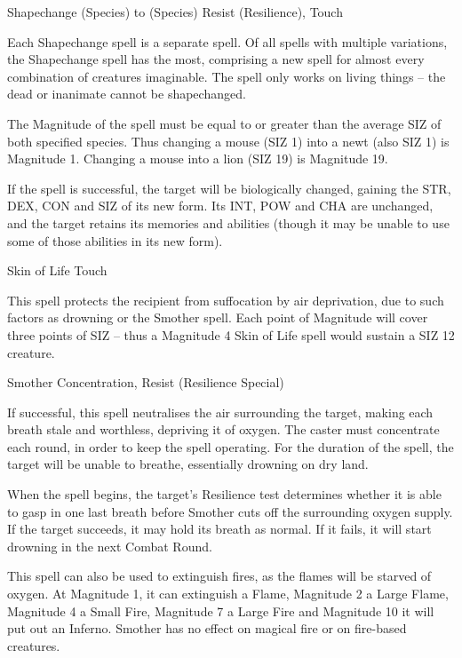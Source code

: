 \begin{samepage}
\begin{rpg-spell}
{Shapechange (Species) to (Species)}
{Resist (Resilience), Touch}

Each Shapechange spell is a separate spell. Of all spells with multiple variations, the Shapechange spell has the most, comprising a new spell for almost every combination of creatures imaginable. The spell only works on living things – the dead or inanimate cannot be shapechanged. 

The Magnitude of the spell must be equal to or greater than the average SIZ of both specified species. Thus changing a mouse (SIZ 1) into a newt (also SIZ 1) is Magnitude 1. Changing a mouse into a lion (SIZ 19) is Magnitude 19. 

If the spell is successful, the target will be biologically changed, gaining the STR, DEX, CON and SIZ of its new form. Its INT, POW and CHA are unchanged, and the target retains its memories and abilities (though it may be unable to use some of those abilities in its new form). 
\end{rpg-spell}
\end{samepage}


\begin{samepage}
\begin{rpg-spell}
{Skin of Life}
{Touch}

This spell protects the recipient from suffocation by air deprivation, due to such factors as drowning or the Smother spell. Each point of Magnitude will cover three points of SIZ – thus a Magnitude 4 Skin of Life spell would sustain a SIZ 12 creature. 
\end{rpg-spell}
\end{samepage}


\begin{samepage}
\begin{rpg-spell}
{Smother}
{Concentration, Resist (Resilience Special)}

If successful, this spell neutralises the air surrounding the target, making each breath stale and worthless, depriving it of oxygen. The caster must concentrate each round, in order to keep the spell operating. For the duration of the spell, the target will be unable to breathe, essentially drowning on dry land. 

When the spell begins, the target’s Resilience test determines whether it is able to gasp in one last breath before Smother cuts off the surrounding oxygen supply. If the target succeeds, it may hold its breath as normal. If it fails, it will start drowning in the next Combat Round. 

This spell can also be used to extinguish fires, as the flames will be starved of oxygen. At Magnitude 1, it can extinguish a Flame, Magnitude 2 a Large Flame, Magnitude 4 a Small Fire, Magnitude 7 a Large Fire and Magnitude 10 it will put out an Inferno. Smother has no effect on magical fire or on fire-based creatures. 
\end{rpg-spell}
\end{samepage}



